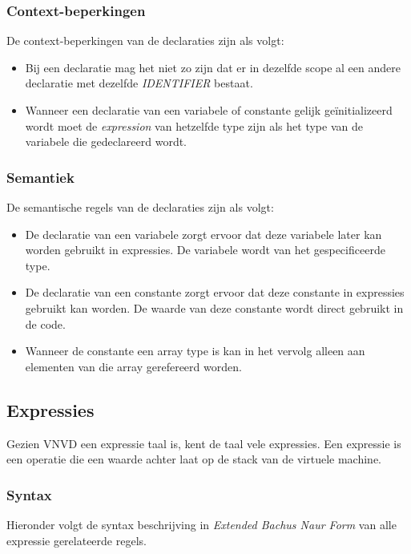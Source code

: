 \subsubsection{Context-beperkingen}
De context-beperkingen van de declaraties zijn als volgt:

\begin{itemize}
	\item Bij een declaratie mag het niet zo zijn dat er in dezelfde scope al een andere declaratie met dezelfde \textit{IDENTIFIER} bestaat.
	\item Wanneer een declaratie van een variabele of constante gelijk ge\"initializeerd wordt moet de \textit{expression} van hetzelfde type zijn als het type van de variabele die gedeclareerd wordt.
\end{itemize}

\subsubsection{Semantiek}
De semantische regels van de declaraties zijn als volgt:

\begin{itemize}
	\item De declaratie van een variabele zorgt ervoor dat deze variabele later kan worden gebruikt in expressies. De variabele wordt van het gespecificeerde type.
	\item De declaratie van een constante zorgt ervoor dat deze constante in expressies gebruikt kan worden. De waarde van deze constante wordt direct gebruikt in de code.
	\item Wanneer de constante een array type is kan in het vervolg alleen aan elementen van die array gerefereerd worden.
\end{itemize}

\subsection{Expressies}
Gezien VNVD een expressie taal is, kent de taal vele expressies. Een expressie is een operatie die een waarde achter laat op de stack van de virtuele machine.

\subsubsection{Syntax}
Hieronder volgt de syntax beschrijving in \textit{Extended Bachus Naur Form} van alle expressie gerelateerde regels.

